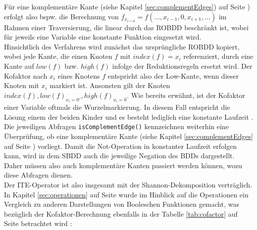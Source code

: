 Für eine komplementäre Kante (siehe Kapitel \ref{sec:complementEdges}) auf Seite \pageref{sec:complementEdges}) erfolgt also bspw. die Berechnung von $f_{x_{i=0}} = f(\dots, x_{i-1}, 0, x_{i+1}, \dots)$ im Rahmen einer Traversierung, die linear durch das ROBDD beschränkt ist, wobei für jeweils eine Variable eine konstante Funktion eingesetzt wird.\\
Hinsichtlich des Verfahrens wird zunächst das ursprüngliche ROBDD kopiert, wobei jede Kante, die einen Knoten $f$ mit $index(f) = x_i$ referenziert, durch eine Kante auf $low(f)$ bzw. $high(f)$ infolge der Reduktionsregeln ersetzt wird. Der Kofaktor nach $x_i$ eines Knotens $f$ entspricht also der Low-Kante, wenn dieser Knoten mit $x_i$ markiert ist. Ansonsten gilt der Knoten $index(f), low(f)_{x_i=0'}, high(f)_{x_i=0}$. Wie bereits erwähnt, ist der Kofaktor einer Variable oftmals die Wurzelmarkierung. In diesem Fall entspricht die Lösung einem der beiden \glqq Kinder\grqq{} und es besteht lediglich eine konstante Laufzeit \cite{g2002}. Die jeweiligen Abfragen \texttt{isComplementEdge()} kennzeichnen weiterhin eine Überprüfung, ob eine komplementäre Kante (siehe Kapitel \ref{sec:complementEdges} auf Seite \pageref{sec:complementEdges}) vorliegt. Damit die Not-Operation in konstanter Laufzeit erfolgen kann, wird in dem SBDD auch die jeweilige Negation des BDDs dargestellt. Daher müssen also auch komplementäre Kanten passiert werden können, wozu diese Abfragen dienen.\\
Der ITE-Operator ist also insgesamt mit der Shannon-Dekomposition verträglich. In Kapitel \ref{sec:operationen} auf Seite \pageref{sec:operationen} wurde im Hinblick auf die Operationen ein Vergleich zu anderen Darstellungen von Booleschen Funktionen gemacht, was bezüglich der Kofaktor-Berechnung ebenfalls in der Tabelle \ref{tab:cofactor} auf Seite \pageref{tab:cofactor} betrachtet wird \cite{m2007}:
\newpage
